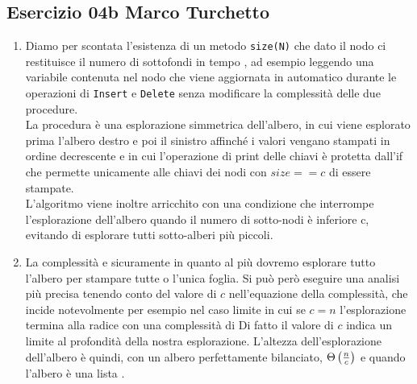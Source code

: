 
\subsection[04b MT]{Esercizio 04b Marco Turchetto}

\begin{enumerate}[label=\alph*)]
\item
	Diamo per scontata l'esistenza di un metodo \texttt{size(N)} che dato il nodo ci restituisce il numero di sottofondi in tempo , ad esempio leggendo una variabile contenuta nel nodo che viene aggiornata in automatico durante le operazioni di \texttt{Insert} e \texttt{Delete} senza modificare la complessità delle due procedure. \\
	La procedura è una esplorazione simmetrica dell'albero, in cui viene esplorato prima l'albero destro e poi il sinistro affinché i valori vengano stampati in ordine decrescente e in cui l'operazione di print delle chiavi è protetta dall'if che permette unicamente alle chiavi dei nodi con  \( size == c \) di essere stampate. \\
	L'algoritmo viene inoltre arricchito con una condizione che interrompe l'esplorazione dell'albero quando il numero di sotto-nodi è inferiore c, evitando di esplorare tutti sotto-alberi più piccoli.
	
\item
	La complessità e sicuramente  in quanto al più dovremo esplorare tutto l'albero per stampare tutte o l'unica foglia.
	Si può però eseguire una analisi più precisa tenendo conto del valore di \( c \) nell'equazione della complessità, che incide notevolmente per esempio nel caso limite in cui se \( c = n \) l'esplorazione termina alla radice con una complessità di 
	Di fatto il valore di \( c \) indica un limite al profondità della nostra esplorazione.
	L'altezza dell'esplorazione dell'albero è quindi, con un albero perfettamente bilanciato, \( \Theta\left( \frac{n}{c} \right) \) e quando l'albero è una lista .
	
	
\end{enumerate}

